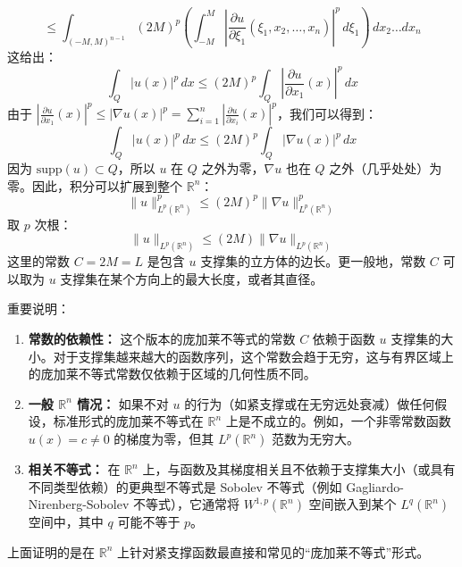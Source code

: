 \[
\le \int_{(-M,M)^{n-1}} (2M)^p \left( \int_{-M}^{M} \left|\frac{\partial u}{\partial \xi_1}(\xi_1, x_2, \dots, x_n)\right|^p \, d\xi_1 \right) \, dx_2 \dots dx_n
\]
这给出：
\[
\int_Q |u(x)|^p \, dx \le (2M)^p \int_Q \left|\frac{\partial u}{\partial x_1}(x)\right|^p \, dx
\]
由于 $\left|\frac{\partial u}{\partial x_1}(x)\right|^p \le |\nabla u(x)|^p = \sum_{i=1}^n \left|\frac{\partial u}{\partial x_i}(x)\right|^p$，我们可以得到：
\[
\int_Q |u(x)|^p \, dx \le (2M)^p \int_Q |\nabla u(x)|^p \, dx
\]
因为 $\text{supp}(u) \subset Q$，所以 $u$ 在 $Q$ 之外为零，$\nabla u$ 也在 $Q$ 之外（几乎处处）为零。因此，积分可以扩展到整个 $\mathbb{R}^n$：
\[
\|u\|_{L^p(\mathbb{R}^n)}^p \le (2M)^p \|\nabla u\|_{L^p(\mathbb{R}^n)}^p
\]
取 $p$ 次根：
\[
\|u\|_{L^p(\mathbb{R}^n)} \le (2M) \|\nabla u\|_{L^p(\mathbb{R}^n)}
\]
这里的常数 $C = 2M = L$ 是包含 $u$ 支撑集的立方体的边长。更一般地，常数 $C$ 可以取为 $u$ 支撑集在某个方向上的最大长度，或者其直径。

重要说明：

\begin{enumerate}
	\item \textbf{常数的依赖性：} 这个版本的庞加莱不等式的常数 $C$ 依赖于函数 $u$ 支撑集的大小。对于支撑集越来越大的函数序列，这个常数会趋于无穷，这与有界区域上的庞加莱不等式常数仅依赖于区域的几何性质不同。
	\item \textbf{一般 $\mathbb{R}^n$ 情况：} 如果不对 $u$ 的行为（如紧支撑或在无穷远处衰减）做任何假设，标准形式的庞加莱不等式在 $\mathbb{R}^n$ 上是不成立的。例如，一个非零常数函数 $u(x)=c \neq 0$ 的梯度为零，但其 $L^p(\mathbb{R}^n)$ 范数为无穷大。
	\item \textbf{相关不等式：} 在 $\mathbb{R}^n$ 上，与函数及其梯度相关且不依赖于支撑集大小（或具有不同类型依赖）的更典型不等式是 Sobolev 不等式（例如 Gagliardo-Nirenberg-Sobolev 不等式），它通常将 $W^{1,p}(\mathbb{R}^n)$ 空间嵌入到某个 $L^q(\mathbb{R}^n)$ 空间中，其中 $q$ 可能不等于 $p$。
\end{enumerate}

上面证明的是在 $\mathbb{R}^n$ 上针对紧支撑函数最直接和常见的“庞加莱不等式”形式。
